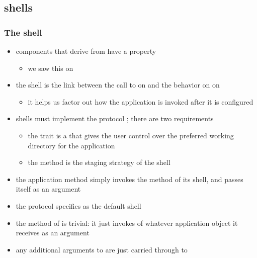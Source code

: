 \subsection{shells}
\begin{frame}
%
  \frametitle{The  shell}
%
  \begin{itemize}
%
  \item components that derive from  have a property 
    \begin{itemize}
    \item we saw this on 
    \end{itemize}
%
  \item the shell is the link between the call to  on
     and the behavior  on
     on 
    \begin{itemize}
    \item it helps us factor out how the application is invoked after it is configured
    \end{itemize}
%
  \item shells must implement the protocol ; there are two requirements
    \begin{itemize}
    \item the trait  is a  that gives the user control over the
      preferred working directory for the application
    \item the method  is the staging strategy of the shell
    \end{itemize}
%
  \item the application method  simply invokes the method  of its
    shell, and passes itself as an argument
%
  \item the protocol  specifies  as the default shell
%
  \item the method  of  is trivial: it just invokes 
    of whatever application object it receives as an argument
%
  \item any additional arguments to  are just carried through to 
%
  \end{itemize}
%
\end{frame}

